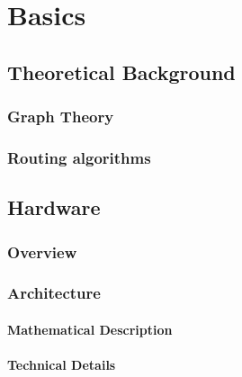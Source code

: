 \chapter{Basics}
\Blindtext[2]

\section{Theoretical Background}
\Blindtext[1]

\subsection{Graph Theory}
\Blindtext[5][2]

\subsection{Routing algorithms}
\Blindtext[10][2]


\section{Hardware}
\Blindtext[1]

\subsection{Overview}
\Blindtext[1]
\blinditemize
\Blindtext[2]

\subsection{Architecture}
\Blindtext[1]

\subsubsection{Mathematical Description}
\Blindtext[1]
\blindmathtrue
\Blindtext[3]
\blindmathfalse

\subsubsection{Technical Details}
\Blindtext[3]
\blindenumerate
\Blindtext[1]
\blinddescription

